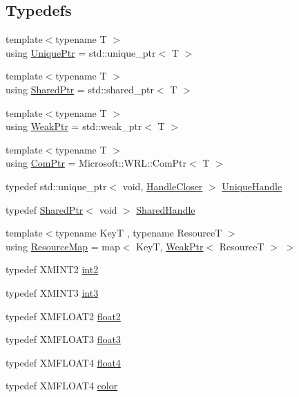 \subsection*{Typedefs}
\begin{DoxyCompactItemize}
\item 
{\footnotesize template$<$typename T $>$ }\\using \hyperlink{namespacemage_a8c307fbcc33bce9b7f2aa4c26c3b95cf}{Unique\+Ptr} = std\+::unique\+\_\+ptr$<$ T $>$
\item 
{\footnotesize template$<$typename T $>$ }\\using \hyperlink{namespacemage_a1e01ae66713838a7a67d30e44c67703e}{Shared\+Ptr} = std\+::shared\+\_\+ptr$<$ T $>$
\item 
{\footnotesize template$<$typename T $>$ }\\using \hyperlink{namespacemage_aa159a63c0d58464bdf32dfe419dd5dc1}{Weak\+Ptr} = std\+::weak\+\_\+ptr$<$ T $>$
\item 
{\footnotesize template$<$typename T $>$ }\\using \hyperlink{namespacemage_ae74f374780900893caa5555d1031fd79}{Com\+Ptr} = Microsoft\+::\+W\+R\+L\+::\+Com\+Ptr$<$ T $>$
\item 
typedef std\+::unique\+\_\+ptr$<$ void, \hyperlink{structmage_1_1_handle_closer}{Handle\+Closer} $>$ \hyperlink{namespacemage_a284e84e551a05d4fc6c957985b2de3ed}{Unique\+Handle}
\item 
typedef \hyperlink{namespacemage_a1e01ae66713838a7a67d30e44c67703e}{Shared\+Ptr}$<$ void $>$ \hyperlink{namespacemage_ab892828913d6129acf71e0cec60467e5}{Shared\+Handle}
\item 
{\footnotesize template$<$typename KeyT , typename ResourceT $>$ }\\using \hyperlink{namespacemage_a0b0a087ad59dd4aa0b4b538d8caec216}{Resource\+Map} = map$<$ KeyT, \hyperlink{namespacemage_aa159a63c0d58464bdf32dfe419dd5dc1}{Weak\+Ptr}$<$ ResourceT $>$ $>$
\item 
typedef X\+M\+I\+N\+T2 \hyperlink{namespacemage_aa22600b49377872988582e782d7b1fcd}{int2}
\item 
typedef X\+M\+I\+N\+T3 \hyperlink{namespacemage_a80c7f9de83dfbbd55bbf339dbcbd99cc}{int3}
\item 
typedef X\+M\+F\+L\+O\+A\+T2 \hyperlink{namespacemage_a536f5856288c280080c9cdf739e85ddc}{float2}
\item 
typedef X\+M\+F\+L\+O\+A\+T3 \hyperlink{namespacemage_aab5dae4b0aaf8129b9e0d651d91d4b38}{float3}
\item 
typedef X\+M\+F\+L\+O\+A\+T4 \hyperlink{namespacemage_aa79484ea5211c29727b3794199ac0a55}{float4}
\item 
typedef X\+M\+F\+L\+O\+A\+T4 \hyperlink{namespacemage_a56eceea5a9bceb2b56073f3ea4945781}{color}
\end{DoxyCompactItemize}
